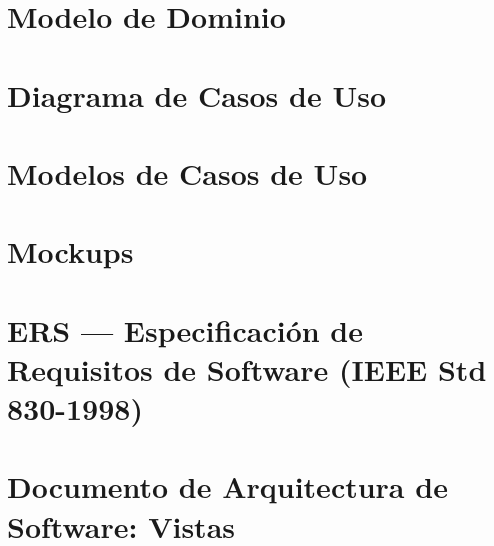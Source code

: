 \documentclass[12pt, a4paper]{article}
\begin{document}


\tableofcontents
\newpage
\listoffigures
\newpage
\listoftables
\newpage

\part{Modelo de Dominio}


\part{Diagrama de Casos de Uso}


\part{Modelos de Casos de Uso}


\part{Mockups}


\part{ERS --- Especificación de Requisitos de Software (IEEE Std 830-1998)}


\part{Documento de Arquitectura de Software: Vistas}


\end{document}
